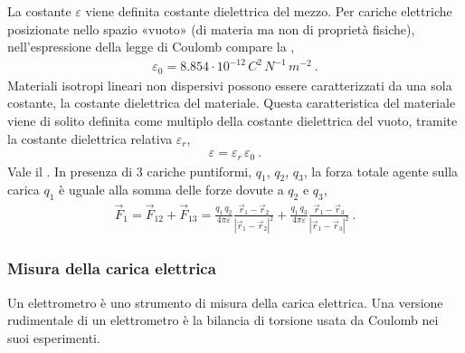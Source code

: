 \documentclass[letterpaper,10pt,italian]{jupyterBook}
\begin{document}
\sphinxAtStartPar
La costante \(\varepsilon\) viene definita costante dielettrica del mezzo. Per cariche elettriche posizionate nello spazio «vuoto» (di materia ma non di proprietà fisiche), nell’espressione della legge di Coulomb compare la ,
\begin{equation*}
\begin{split}\varepsilon_0 = 8.854 \cdot 10^{-12} \, C^2 \, N^{-1} \, m^{-2} \ .\end{split}
\end{equation*}
\sphinxAtStartPar
Materiali isotropi lineari non dispersivi possono essere caratterizzati da una sola costante, la costante dielettrica del materiale. Questa caratteristica del materiale viene di solito definita come multiplo della costante dielettrica del vuoto, tramite la costante dielettrica relativa \(\varepsilon_r\),
\begin{equation*}
\begin{split}\varepsilon = \varepsilon_r \,\varepsilon_0 \ . \end{split}
\end{equation*}
\sphinxAtStartPar
Vale il . In presenza di 3 cariche puntiformi, \(q_1\), \(q_2\), \(q_3\), la forza totale agente sulla carica \(q_1\) è uguale alla somma delle forze dovute a \(q_2\) e \(q_3\),
\begin{equation*}
\begin{split}\vec{F}_1 = \vec{F}_{12} + \vec{F}_{13} = \frac{q_1 \, q_2}{4 \pi \varepsilon}\frac{\vec{r}_1 - \vec{r}_2}{|\vec{r}_1 - \vec{r}_2|^2} +  \frac{q_1 \, q_3}{4 \pi \varepsilon}\frac{\vec{r}_1 - \vec{r}_3}{|\vec{r}_1 - \vec{r}_3|^2} \ .\end{split}
\end{equation*}
\begin{figure}[htbp]
\centering

\noindent{}
\end{figure}




\subsubsection{Misura della carica elettrica}
\label{\detokenize{ch/electromagnetism/electrostatics:misura-della-carica-elettrica}}
\sphinxAtStartPar
Un elettrometro è uno strumento di misura della carica elettrica. Una versione rudimentale di un elettrometro è la bilancia di torsione usata da Coulomb nei suoi esperimenti.
\end{document}
